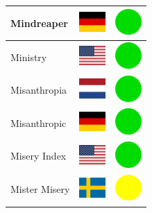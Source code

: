 \documentclass[12pt, a4paper, twoside]{report}
\begin{document}
\begin{center}
\begin{longtable}{|p{5cm}|p{2cm}|p{2cm}|}
 Mindreaper                                                 & \includegraphics[width=1cm]{../4x3/de} &   \includegraphics[width=1cm]{../likes/y} \\ \hline
 Ministry                                                   & \includegraphics[width=1cm]{../4x3/us} &   \includegraphics[width=1cm]{../likes/y} \\ \hline
 Misanthropia                                               & \includegraphics[width=1cm]{../4x3/nl} &   \includegraphics[width=1cm]{../likes/y} \\ \hline
 Misanthropic                                               & \includegraphics[width=1cm]{../4x3/de} &   \includegraphics[width=1cm]{../likes/y} \\ \hline
 Misery Index                                               & \includegraphics[width=1cm]{../4x3/us} &   \includegraphics[width=1cm]{../likes/y} \\ \hline
 Mister Misery                                              & \includegraphics[width=1cm]{../4x3/se} &   \includegraphics[width=1cm]{../likes/m} \\ \hline

\end{longtable}
\end{center}
\end{document}
